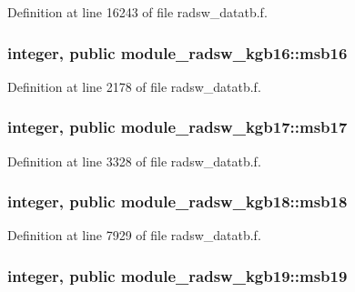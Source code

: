 Definition at line 16243 of file radsw\+\_\+datatb.\+f.

\subsubsection[{\texorpdfstring{msb16}{msb16}}]{\setlength{\rightskip}{0pt plus 5cm}integer, public module\+\_\+radsw\+\_\+kgb16\+::msb16}\hypertarget{group__module__radsw__main_ga2ce1ab36897fb1fc7d85cbf7fe539e59}{}\label{group__module__radsw__main_ga2ce1ab36897fb1fc7d85cbf7fe539e59}


Definition at line 2178 of file radsw\+\_\+datatb.\+f.

\subsubsection[{\texorpdfstring{msb17}{msb17}}]{\setlength{\rightskip}{0pt plus 5cm}integer, public module\+\_\+radsw\+\_\+kgb17\+::msb17}\hypertarget{group__module__radsw__main_gafbb056103147b8e5f4d5a8af40420ea0}{}\label{group__module__radsw__main_gafbb056103147b8e5f4d5a8af40420ea0}


Definition at line 3328 of file radsw\+\_\+datatb.\+f.

\subsubsection[{\texorpdfstring{msb18}{msb18}}]{\setlength{\rightskip}{0pt plus 5cm}integer, public module\+\_\+radsw\+\_\+kgb18\+::msb18}\hypertarget{group__module__radsw__main_gad2e52d9beb90328236a351926d1a3432}{}\label{group__module__radsw__main_gad2e52d9beb90328236a351926d1a3432}


Definition at line 7929 of file radsw\+\_\+datatb.\+f.

\subsubsection[{\texorpdfstring{msb19}{msb19}}]{\setlength{\rightskip}{0pt plus 5cm}integer, public module\+\_\+radsw\+\_\+kgb19\+::msb19}\hypertarget{group__module__radsw__main_ga42771fcf9dd17b5c9d0d03cb2bf1c923}{}\label{group__module__radsw__main_ga42771fcf9dd17b5c9d0d03cb2bf1c923}


